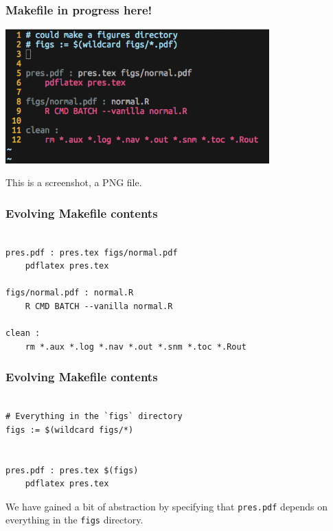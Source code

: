 \documentclass{beamer}
\begin{document}

\begin{frame}
\frametitle{Makefile in progress here!}
\includegraphics[width=4in]{figs/makefile.png}

This is a screenshot, a PNG file.
\end{frame}


\begin{frame}[fragile]
\frametitle{Evolving Makefile contents}
\begin{verbatim}

pres.pdf : pres.tex figs/normal.pdf
    pdflatex pres.tex

figs/normal.pdf : normal.R
    R CMD BATCH --vanilla normal.R 

clean :
    rm *.aux *.log *.nav *.out *.snm *.toc *.Rout

\end{verbatim}
\end{frame}


\begin{frame}[fragile]
\frametitle{Evolving Makefile contents}
\begin{verbatim}

# Everything in the `figs` directory
figs := $(wildcard figs/*)


pres.pdf : pres.tex $(figs)
    pdflatex pres.tex

\end{verbatim}

We have gained a bit of abstraction by specifying that {\tt pres.pdf} depends on everything in the {\tt figs} directory.

\end{frame}
\end{document}
